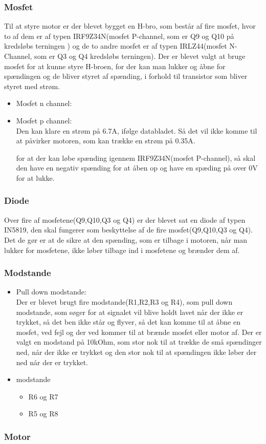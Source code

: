 \subsubsection{Mosfet}
Til at styre motor er der blevet bygget en H-bro, som består af fire mosfet, hvor to af dem er af typen  IRF9Z34N(mosfet P-channel, som er Q9 og Q10 på kredsløbs terningen ) og de to andre mosfet er af typen IRLZ44(mosfet N-Channel, som er Q3 og Q4 kredsløbs terningen). Der er blevet valgt at bruge mosfet for at kunne styre H-broen, for der kan man lukker og åbne for spændingen og de bliver styret af spænding, i forhold til transistor som bliver styret med strøm.
\begin{itemize}
	\item Mosfet n channel:\\
	\item 
	Mosfet p channel: \\
	Den kan klare en strøm på 6.7A, ifølge databladet. Så det vil ikke komme til at påvirker motoren, som kan trække en strøm på 0.35A. 
	
	for at der kan løbe spænding igennem IRF9Z34N(mosfet P-channel), så skal den have en negativ spænding for at åben op og have en spæding på over 0V for at lukke. 
	
\end{itemize}
\subsubsection{Diode}
Over fire af mosfetene(Q9,Q10,Q3 og Q4) er der blevet sat en diode af typen IN5819, den skal fungerer som beskyttelse af de fire mosfet(Q9,Q10,Q3 og Q4). Det de gør er at de sikre at den spænding, som er tilbage i motoren, når man lukker for mosfetene, ikke løber tilbage ind i mosfetene og brænder dem af.

\subsubsection{Modstande}
\begin{itemize}
	\item Pull down modstande:\\
	Der er blevet brugt fire modstande(R1,R2,R3 og R4), som pull down modstande, som søger for at signalet vil blive holdt lavet når der ikke er trykket, så det ben ikke står og flyver, så det kan komme til at åbne en mosfet, ved fejl og der ved kommer til at brænde mosfet eller motor af.  Der er valgt en modstand på 10kOhm, som stor nok til at trække de små spændinger ned, når der ikke er trykket og den stor nok til at spændingen ikke løber der ned når der er trykket.
	\item modstande
	\begin{itemize}
		\item R6 og R7
		
		\item R5 og R8
	\end{itemize}
	
	
\end{itemize}
\subsubsection{Motor}